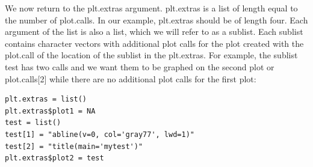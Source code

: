 \documentclass[]{article}
\begin{document}
\quad We now return to the plt.extras argument. plt.extras is a list of length equal to the number of plot.calls. In our example, plt.extras should be of length four. Each argument of the list is also a list, which we will refer to as a sublist. Each sublist contains character vectors with additional plot calls for the plot created with the plot.call of the location of the sublist in the plt.extras. For example, the sublist test has two calls and we want them to be graphed on the second plot or plot.calls[2] while there are no additional plot calls for the first plot:

\begin{verbatim}
plt.extras = list()
plt.extras$plot1 = NA
test = list()
test[1] = "abline(v=0, col='gray77', lwd=1)"
test[2] = "title(main='mytest')"
plt.extras$plot2 = test
\end{verbatim}  
\end{document}
